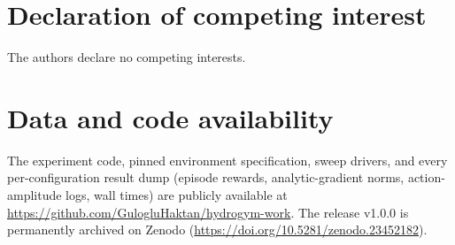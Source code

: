 \documentclass[preprint,12pt,3p]{elsarticle}
\begin{document}
\section*{Declaration of competing interest}
The authors declare no competing interests.

\section*{Data and code availability}
The experiment code, pinned environment specification, sweep drivers, and
every per-configuration result dump (episode rewards, analytic-gradient
norms, action-amplitude logs, wall times) are publicly available at
\url{https://github.com/GulogluHaktan/hydrogym-work}. The release v1.0.0 is permanently
archived on Zenodo (\url{https://doi.org/10.5281/zenodo.23452182}).



\end{document}

